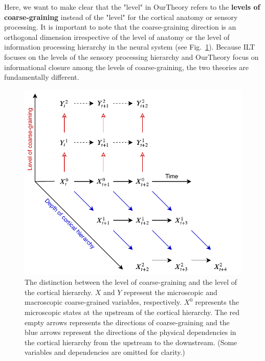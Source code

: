 \documentclass[utf8]{article}
\begin{document}
    		Here, we want to make clear that the "level" in \ac{OurTheory} refers to the \textbf{levels of coarse-graining} instead of the "level" for the cortical anatomy or sensory processing. It is important to note that the coarse-graining direction is an orthogonal dimension irrespective of the level of anatomy or the level of information processing hierarchy in the neural system (see Fig.~\ref{fig:hierarchy}). Because ILT focuses on the levels of the sensory processing hierarchy and \ac{OurTheory} focus on informational closure among the levels of coarse-graining, the two theories are fundamentally different.  
    		
    		
    		\begin{figure}[H]
    			\includegraphics[width=\textwidth]{WritingMaterials/Fig_SeperationOfCGandCortHierachy/SeperationOfCGandCortHierachy.pdf}
				\caption{The distinction between the level of coarse-graining and the level of the cortical hierarchy. $X$ and $Y$ represent the microscopic and macroscopic coarse-grained  variables, respectively. $X^0$ represents the microscopic states at the upstream of the cortical hierarchy. The red empty arrows represents the directions of coarse-graining and the blue arrows represent the directions of the physical dependencies in the cortical hierarchy from the upstream to the downstream. (Some variables and dependencies are omitted for clarity.)}
				\label{fig:hierarchy}
    		\end{figure} 
    		
        
\end{document}
